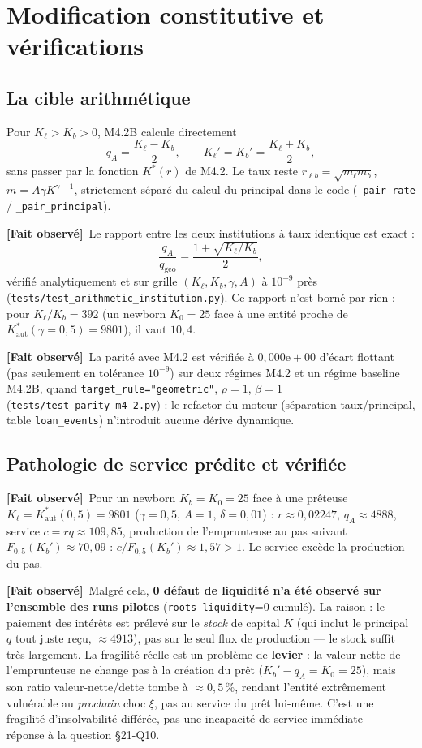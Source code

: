 \documentclass[11pt,a4paper]{article}
\newcommand{\code}[1]{\texttt{#1}}
\newcommand{\Kaut}{K^{*}_{\mathrm{aut}}}
\newcommand{\fait}{\textbf{[Fait observé]}}
\begin{document}
\tableofcontents

\section{Modification constitutive et vérifications}

\subsection{La cible arithmétique}

Pour $K_\ell>K_b>0$, M4.2B calcule directement
\[
q_A=\frac{K_\ell-K_b}{2},\qquad K_\ell'=K_b'=\frac{K_\ell+K_b}{2},
\]
sans passer par la fonction $K^*(r)$ de M4.2. Le taux reste
$r_{\ell b}=\sqrt{m_\ell m_b}$, $m=A\gamma K^{\gamma-1}$, strictement
séparé du calcul du principal dans le code (\code{\_pair\_rate} /
\code{\_pair\_principal}).

\fait\ Le rapport entre les deux institutions à taux identique est exact :
\[
\frac{q_A}{q_{\mathrm{geo}}}=\frac{1+\sqrt{K_\ell/K_b}}{2},
\]
vérifié analytiquement et sur grille $(K_\ell,K_b,\gamma,A)$ à $10^{-9}$
près (\code{tests/test\_arithmetic\_institution.py}). Ce rapport n'est
borné par rien : pour $K_\ell/K_b=392$ (un newborn $K_0=25$ face à une
entité proche de $\Kaut(\gamma{=}0{,}5)=9801$), il vaut $10{,}4$.

\fait\ La parité avec M4.2 est vérifiée à $0{,}000\mathrm{e}{+}00$ d'écart
flottant (pas seulement en tolérance $10^{-9}$) sur deux régimes M4.2 et un
régime baseline M4.2B, quand \code{target\_rule="geometric"},
$\rho=1$, $\beta=1$ (\code{tests/test\_parity\_m4\_2.py}) : le refactor du
moteur (séparation taux/principal, table \code{loan\_events}) n'introduit
aucune dérive dynamique.

\subsection{Pathologie de service prédite et vérifiée}

\fait\ Pour un newborn $K_b=K_0=25$ face à une prêteuse
$K_\ell=\Kaut(0{,}5)=9801$ ($\gamma=0{,}5$, $A=1$, $\delta=0{,}01$) :
$r\approx0{,}02247$, $q_A\approx4888$, service $c=rq\approx109{,}85$,
production de l'emprunteuse au pas suivant
$F_{0,5}(K_b')\approx70{,}09$ : $c/F_{0,5}(K_b')\approx1{,}57>1$. Le
service excède la production du pas.

\fait\ Malgré cela, \textbf{0 défaut de liquidité n'a été observé sur
l'ensemble des runs pilotes} (\code{roots\_liquidity}=0 cumulé). La raison :
le paiement des intérêts est prélevé sur le \emph{stock} de capital $K$
(qui inclut le principal $q$ tout juste reçu, $\approx4913$), pas sur le
seul flux de production --- le stock suffit très largement. La fragilité
réelle est un problème de \textbf{levier} : la valeur nette de
l'emprunteuse ne change pas à la création du prêt ($K_b'-q_A=K_0=25$),
mais son ratio valeur-nette/dette tombe à $\approx0{,}5\,\%$, rendant
l'entité extrêmement vulnérable au \emph{prochain} choc $\xi$, pas au
service du prêt lui-même. C'est une fragilité d'insolvabilité différée,
pas une incapacité de service immédiate --- réponse à la question §21-Q10.
\end{document}
